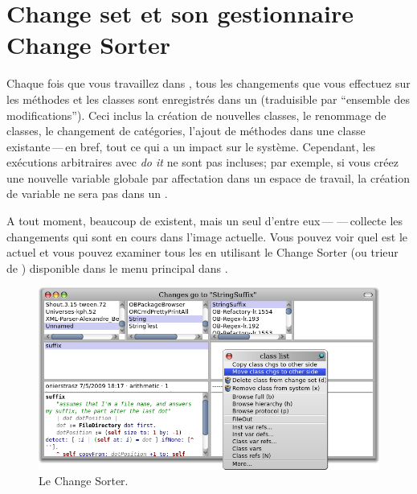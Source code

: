 \documentclass[a4paper,10pt,twoside]{book}
\begin{document}
\section{Change set et son gestionnaire Change Sorter}

Chaque fois que vous travaillez dans \pharo, tous les changements que vous effectuez
sur les méthodes et les classes sont enregistrés dans un
 (traduisible par ``ensemble des modifications'').
Ceci inclus la création de nouvelles classes, le renommage de classes, le changement de
catégories, l'ajout de méthodes dans une classe existante\,---\,en bref, tout ce qui a un impact sur le système.
Cependant, les exécutions arbitraires avec \emph{do it} ne sont pas
incluses; par exemple, si vous créez une nouvelle variable globale par affectation dans 
un espace de travail, la création de variable ne sera pas dans un 
.

A tout moment, beaucoup de \changesets existent, mais un seul d'entre eux\,---\,\,---\,collecte les changements qui sont en cours dans l'image actuelle.
Vous pouvez voir quel \changeset est le \changeset actuel et vous pouvez examiner
tous les \changesets en utilisant le Change Sorter
(ou trieur de \changeset) disponible dans le menu
principal dans .

\begin{figure}[btp]
	\begin{center}
		\includegraphics[width=\linewidth]{changeSorter}
	\end{center}
	\caption{Le Change Sorter.}
\end{figure}
\end{document}
